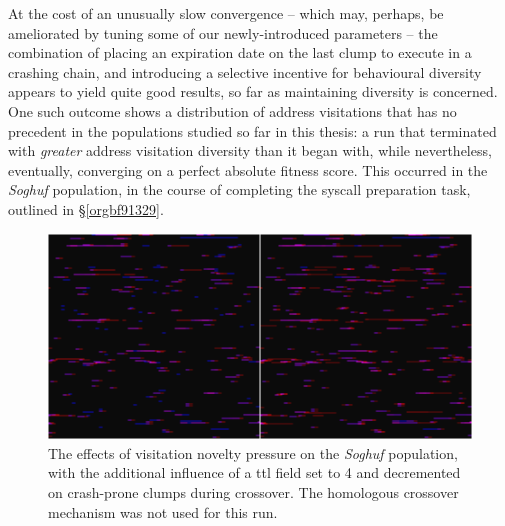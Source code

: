 \documentclass[12pt,glossary]{dalthesis}
\begin{document}
At the cost of an unusually slow convergence -- which may, perhaps, be
ameliorated by tuning some of our newly-introduced parameters -- the combination
of placing an expiration date on the last clump to execute in a crashing chain,
and introducing a selective incentive for behavioural diversity appears to yield
quite good results, so far as maintaining diversity is concerned. One such outcome
shows a distribution of address visitations that has no precedent in the populations
studied so far in this thesis: a run that terminated with \emph{greater} address visitation
diversity than it began with, while nevertheless, eventually, converging on a perfect
absolute fitness score. This occurred in the \emph{Soghuf} population, in the course of
completing the syscall preparation task, outlined in \S \ref{orgbf91329}.

\begin{figure}[htbp]
\centering
\includegraphics[width=.9\linewidth]{../images/plots/soghuf_heatmap_4_608.png}
\caption{\label{fig:org7fb94cf}
The effects of visitation novelty pressure on the \emph{Soghuf} population, with the additional influence of a \gls{ttl} field set to 4 and decremented on crash-prone clumps during crossover. The homologous crossover mechanism was not used for this run.}
\end{figure}
\end{document}
